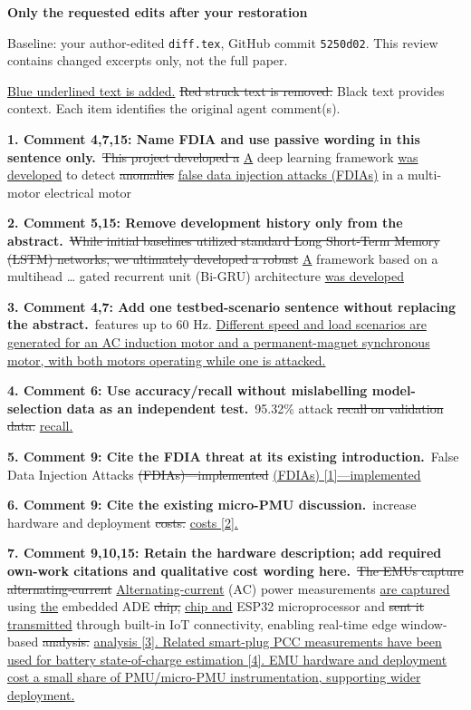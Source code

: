 \documentclass[10pt,letterpaper]{article}
\newcommand{\added}[1]{{\color{blue}\uline{#1}}}
\newcommand{\removed}[1]{{\color{red}\sout{#1}}}
\begin{document}
{\large\bfseries Only the requested edits after your restoration}\par
Baseline: your author-edited \texttt{diff.tex}, GitHub commit \texttt{5250d02}. This review contains changed excerpts only, not the full paper.\par
\added{Blue underlined text is added.} \removed{Red struck text is removed.} Black text provides context. Each item identifies the original agent comment(s).\par
\textbf{1. Comment 4,7,15: Name FDIA and use passive wording in this sentence only.}\
\removed{This project developed a} \added{A} deep learning framework \added{was developed} to detect \removed{anomalies} \added{false data injection attacks (FDIAs)} in a multi-motor electrical motor\par
\textbf{2. Comment 5,15: Remove development history only from the abstract.}\
\removed{While initial baselines utilized standard Long Short-Term Memory (LSTM) networks, we ultimately developed a robust} \added{A} framework based on a multihead \ldots{} gated recurrent unit (Bi-GRU) architecture \added{was developed}\par
\textbf{3. Comment 4,7: Add one testbed-scenario sentence without replacing the abstract.}\
features up to 60 Hz. \added{Different speed and load scenarios are generated for an AC induction motor and a permanent-magnet synchronous motor, with both motors operating while one is attacked.}\par
\textbf{4. Comment 6: Use accuracy/recall without mislabelling model-selection data as an independent test.}\
95.32\% attack \removed{recall on validation data.} \added{recall.}\par
\textbf{5. Comment 9: Cite the FDIA threat at its existing introduction.}\
False Data Injection Attacks \removed{(FDIAs)---implemented} \added{(FDIAs) [1]---implemented}\par
\textbf{6. Comment 9: Cite the existing micro-PMU discussion.}\
increase hardware and deployment \removed{costs.} \added{costs [2].}\par
\textbf{7. Comment 9,10,15: Retain the hardware description; add required own-work citations and qualitative cost wording here.}\
\removed{The EMUs capture alternating-current} \added{Alternating-current} (AC) power measurements \added{are captured} using \added{the} embedded ADE \removed{chip,} \added{chip and} ESP32 microprocessor and \removed{sent it} \added{transmitted} through built-in IoT connectivity, enabling real-time edge window-based \removed{analysis.} \added{analysis [3]. Related smart-plug PCC measurements have been used for battery state-of-charge estimation [4]. EMU hardware and deployment cost a small share of PMU/micro-PMU instrumentation, supporting wider deployment.}\par
\end{document}
